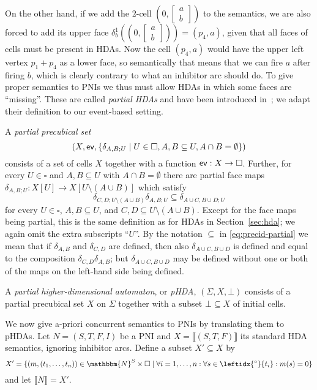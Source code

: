 \documentclass[runningheads,envcountsame]{llncs}
\newcommand*\ev{\textup{\textsf{ev}}}
\newcommand*\Nat{\mathbbm{N}}
\newcommand*\loset[1]{\left[\begin{smallmatrix}#1\end{smallmatrix}\right]}
\newcommand*\prepli[1]{\leftidx{^\circ}{#1}}
\newcommand*\sem[1]{\llbracket #1\rrbracket}
\begin{document}
On the other hand, if we add the $2$-cell $(0, \loset{a\\b})$ to the semantics,
we are also forced to add its upper face $\delta_b^1((0, \loset{a\\b}))=(p_4, a)$,
given that all faces of cells must be present in HDAs.
Now the cell $(p_4, a)$ would have the upper left vertex $p_1+p_4$ as a lower face,
so semantically that means that we can fire $a$ after firing $b$, which is clearly contrary to what an inhibitor arc should do.
To give proper semantics to PNIs we thus must allow HDAs in which some faces are ``missing''.
These are called \emph{partial HDAs} and have been introduced in~\cite{DBLP:conf/calco/FahrenbergL15, DBLP:conf/fossacs/Dubut19};
we adapt their definition to our event-based setting.

A \emph{partial precubical set}
\begin{equation*}
  (X, \ev, \{\delta_{A, B; U}\mid U\in \square, A, B\subseteq U, A\cap B=\emptyset\})
\end{equation*}
consists of a set of cells $X$
together with a function $\ev: X\to \square$.
Further, for every $U\in \square$ and $A, B\subseteq U$ with $A\cap B=\emptyset$ there are partial face maps
$\delta_{A, B; U}: X[U]\to X[U\setminus(A\cup B)]$
which satisfy
\begin{equation}
  \label{eq:precid-partial}
  \delta_{C, D; U\setminus(A\cup B)} \delta_{A, B; U}\subseteq \delta_{A\cup C, B\cup D; U}
\end{equation}
for every $U\in \square$, $A, B\subseteq U$, and $C, D\subseteq U\setminus(A\cup B)$.
Except for the face maps being partial, this is the same definition as for HDAs in Section~\ref{sec:hda};
we again omit the extra subscripts ``$U$''.
By the notation $\subseteq$ in \eqref{eq:precid-partial} we mean that
if $\delta_{A, B}$ and $\delta_{C, D}$ are defined,
then also $\delta_{A\cup C, B\cup D}$ is defined and equal to the composition $\delta_{C, D} \delta_{A, B}$;
but $\delta_{A\cup C, B\cup D}$ may be defined without one or both of the maps on the left-hand side being defined.

A \emph{partial higher-dimensional automaton}, or \emph{pHDA},
$(\Sigma, X, \bot)$
consists of a partial precubical set $X$ on $\Sigma$ together with a subset $\bot\subseteq X$ of initial cells.

We now give a-priori concurrent semantics to PNIs by translating them to pHDAs.
Let $N=(S, T, F, I)$ be a PNI and $X=\sem{(S, T, F)}$ its standard HDA semantics,
ignoring inhibitor arcs.
Define a subset $X'\subseteq X$ by
\begin{equation*}
  X' = \{(m, (t_1,\dotsc, t_n))\in \Nat^S\times \square\mid \forall i=1,\dotsc, n: \forall s\in \prepli{t_i}: m(s)=0\}
\end{equation*}
and let $\sem{N}=X'$.
\end{document}

